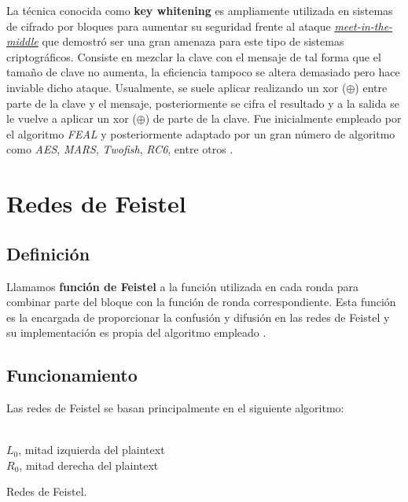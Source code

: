 \begin{dfn}
	La técnica conocida como \textbf{key whitening} es ampliamente utilizada en sistemas de cifrado por bloques para aumentar su seguridad frente al ataque \href{https://en.wikipedia.org/wiki/Key_whitening} {\textit{meet-in-the-middle}} que demostró ser una gran amenaza para este tipo de sistemas criptográficos. Consiste en mezclar la clave con el mensaje de tal forma que el tamaño de clave no aumenta, la eficiencia tampoco se altera demasiado pero hace inviable dicho ataque. Usualmente, se suele aplicar realizando un xor ($\oplus$) entre parte de la clave y el mensaje, posteriormente se cifra el resultado y a la salida se le vuelve a aplicar un xor ($\oplus$) de parte de la clave. Fue inicialmente empleado por el algoritmo \textit{FEAL} y posteriormente adaptado por un gran número de algoritmo como \textit{AES}, \textit{MARS}, \textit{Twofish}, \textit{RC6}, entre otros \cite{Crypto_Bases2}.
\end{dfn}

\section{Redes de Feistel}
\label{sec_feistelnet}

\subsection{Definición}
\begin{dfn}
	Llamamos \textbf{función de Feistel} a la función utilizada en cada ronda para combinar parte del bloque con la función de ronda correspondiente. Esta función es la encargada de proporcionar la confusión y difusión en las redes de Feistel y su implementación es propia del algoritmo empleado \cite{Feistel_Def}.
\end{dfn}

\subsection{Funcionamiento}
Las redes de Feistel se basan principalmente en el siguiente algoritmo:

\begin{algorithm}[H]
	\begin{algorithmic}[1]
		\REQUIRE \ \\
			\texttt{$L_0$}, mitad izquierda del plaintext\\
			\texttt{$R_0$}, mitad derecha del plaintext\\
		\ENDFOR
		
	\end{algorithmic}
	\caption{Redes de Feistel.}
	\label{alg:feistelnet}
\end{algorithm}

